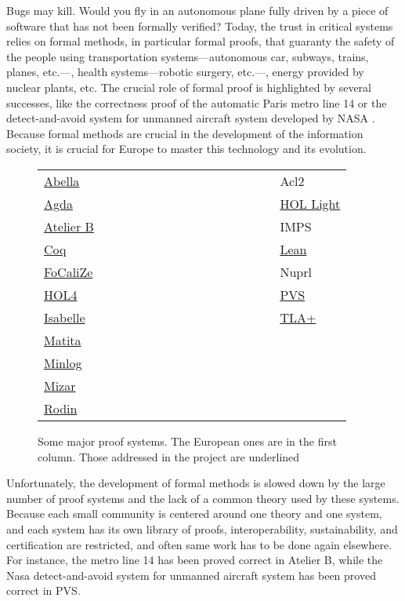 Bugs may kill. Would you fly in an autonomous plane fully driven by a
piece of software that has not been formally verified?  Today, the
trust in critical systems relies on formal methods, in particular
formal proofs, that guaranty the safety of the people using
transportation systems---autonomous car, subways, trains, planes,
etc.---, health systems---robotic surgery, etc.---, energy provided by
nuclear plants, etc. The crucial role of formal proof is highlighted
by several successes, like the correctness proof of the automatic
Paris metro line 14 \cite{metro14} or the detect-and-avoid system for
unmanned aircraft system developed by NASA \cite{Munoz16}.  Because
formal methods are crucial in the development of the information
society, it is crucial for Europe to master this technology and its
evolution.

\thispagestyle{empty}

\begin{figure}
\begin{tabular}{ll}
  {\sc \underline{Abella}}~~~~~~~~~~~~~~~~~~~~~~~~~~~~~~&{\sc Acl2}\\
{\sc \underline{Agda}} &  {\sc \underline{HOL Light}}\\
{\sc \underline{Atelier B}} &  {\sc IMPS}\\
{\sc \underline{Coq}}  &  {\sc \underline{Lean}}\\
{\sc \underline{FoCaliZe}}  &  {\sc Nuprl}\\
{\sc \underline{HOL4}}  &  {\sc \underline{PVS}}\\
{\sc \underline{Isabelle}}  &  {\sc \underline{TLA+}}\\
{\sc \underline{Matita}}\\
{\sc \underline{Minlog}}\\
{\sc \underline{Mizar}}\\
{\sc \underline{Rodin}}\\
\end{tabular}
\caption{Some major proof systems. The European ones are in the first column.
  Those addressed in the project are underlined\label{systems}}
\end{figure}

Unfortunately, the development of formal methods is slowed down by the
large number of proof systems and the lack of a common theory used by
these systems. Because each small community is centered around one theory
and one system, and each system has its own library of proofs, 
interoperability, sustainability, and certification are
restricted, and often same work has to be done again elsewhere.  For
instance, the metro line 14 has been proved correct in {\sc Atelier
B}, while the Nasa detect-and-avoid system for unmanned aircraft
system has been proved correct in {\sc PVS}.

